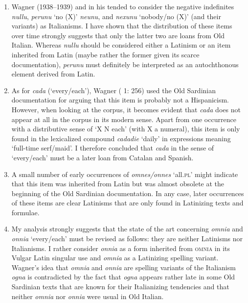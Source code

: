 \documentclass[output=paper,colorlinks,citecolor=brown]{langscibook}
\begin{document}
\begin{enumerate}
    \item Wagner (1938--1939) and in his  tended to consider the negative indefinites \textit{nullu}, \textit{perunu} ‘no (X)’ \textit{neunu}, and \textit{nexunu} ‘nobody/no (X)’ (and their variants) as Italianisms. I have shown that the distribution of these items over time strongly suggests that only the latter two are loans from Old Italian. Whereas \textit{nullu} should be considered either a Latinism or an item inherited from Latin (maybe rather the former given its scarce documentation), \textit{perunu} must definitely be interpreted as an autochthonous element derived from Latin.
    \item As for \textit{cada} (‘every/each’), Wagner ( 1: 256) used the Old Sardinian documentation for arguing that this item is probably not a Hispanicism. However, when looking at the corpus, it becomes evident that \textit{cada} does not appear at all in the corpus in its modern sense. Apart from one occurrence with a distributive sense of ‘X N each’ (with X a numeral), this item is only found in the lexicalized compound \textit{cadadie} ‘daily’ in expressions meaning ‘full-time serf/maid’. I therefore concluded that \textit{cada} in the sense of ‘every/each’ must be a later loan from Catalan and Spanish.
    \item A small number of early occurrences of \textit{omnes/onnes} ‘all.\textsc{pl}’ might indicate that this item was inherited from Latin but was almost obsolete at the beginning of the Old Sardinian documentation. In any case, later occurrences of these items are clear Latinisms that are only found in Latinizing texts and formulae.
    \item My analysis strongly suggests that the state of the art concerning \textit{omnia} and \textit{onnia} ‘every/each’ must be revised as follows: they are neither Latinisms nor Italianisms. I rather consider \textit{onnia} as a form inherited from \textsc{omnia} in its Vulgar Latin singular use and \textit{omnia} as a Latinizing spelling variant. Wagner’s idea that \textit{omnia} and \textit{onnia} are spelling variants of the Italianism \textit{ogna} is contradicted by the fact that \textit{ogna} appears rather late in some Old Sardinian texts that are known for their Italianizing tendencies and that neither \textit{omnia} nor \textit{onnia} were usual in Old Italian.
\end{enumerate}
\end{document}
